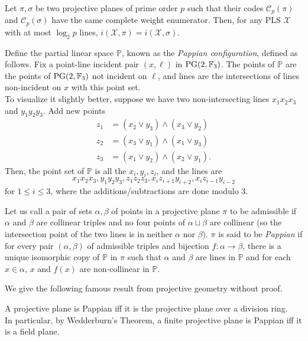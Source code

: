 	\begin{corollary}
		\label{same cwe same i}
		Let $\pi,\sigma$ be two projective planes of prime order $p$ such that their codes $\mathcal{C}_p(\pi)$ and $\mathcal{C}_p(\sigma)$ have the same complete weight enumerator. Then, for any PLS $\mathcal{X}$ with at most $\log_2 p$ lines, $i(\mathcal{X},\pi) = i(\mathcal{X},\sigma)$.
	\end{corollary}

	Define the partial linear space $\mathbb{P}$, known as the \emph{Pappian configuration}, defined as follows. Fix a point-line incident pair $(x,\ell)$ in $\operatorname{PG}(2,\mathbb{F}_3)$. The points of $\mathbb{P}$ are the points of $\operatorname{PG}(2,\mathbb{F}_3)$ not incident on $\ell$, and lines are the intersections of lines non-incident on $x$ with this point set.\\
	To visualize it slightly better, suppose we have two non-intersecting lines $x_1x_2x_3$ and $y_1y_2y_3$. Add new points
	\begin{align*}
		z_1 &= (x_2 \lor y_3) \land (x_3 \lor y_2) \\
		z_2 &= (x_3 \lor y_1) \land (x_1 \lor y_3) \\
		z_3 &= (x_1 \lor y_2) \land (x_2 \lor y_1).
	\end{align*}
	Then, the point set of $\mathbb{P}$ is all the $x_i,y_i,z_i$, and the lines are
	\[ x_1x_2x_3, y_1y_2y_3, z_1z_2z_3, x_iz_{i+1}y_{i+2}, x_iz_{i-1}y_{i-2} \]
	for $1 \le i \le 3$, where the additions/subtractions are done modulo $3$.

	\begin{definition}
		Let us call a pair of sets $\alpha,\beta$ of points in a projective plane $\pi$ to be admissible if $\alpha$ and $\beta$ are collinear triples and no four points of $\alpha \sqcup \beta$ are collinear (so the intersection point of the two lines is in neither $\alpha$ nor $\beta$). $\pi$ is said to be \emph{Pappian} if for every pair $(\alpha,\beta)$ of admissible triples and bijection $f : \alpha \to \beta$, there is a unique isomorphic copy of $\mathbb{P}$ in $\pi$ such that $\alpha$ and $\beta$ are lines in $\mathbb{P}$ and for each $x \in \alpha$, $x$ and $f(x)$ are non-collinear in $\mathbb{P}$.
	\end{definition}

	We give the following famous result from projective geometry without proof.

	\begin{theorem}
		A projective plane is Pappian iff it is the projective plane over a division ring.\\
		In particular, by Wedderburn's Theorem, a finite projective plane is Pappian iff it is a field plane.
	\end{theorem}

